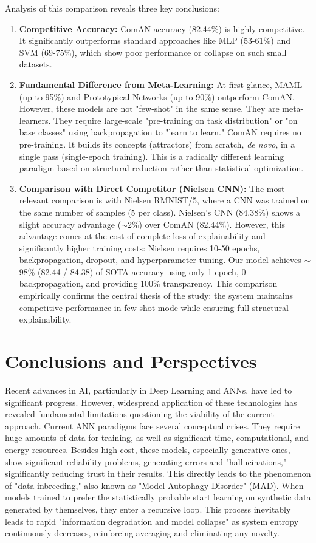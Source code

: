 \documentclass[conference]{IEEEtran}
\begin{document}
Analysis of this comparison reveals three key conclusions:
\begin{enumerate}
    \item \textbf{Competitive Accuracy:} ComAN accuracy (82.44\%) is highly competitive. It significantly outperforms standard approaches like MLP (53-61\%) and SVM (69-75\%), which show poor performance or collapse on such small datasets.
    \item \textbf{Fundamental Difference from Meta-Learning:} At first glance, MAML (up to 95\%) and Prototypical Networks (up to 90\%) outperform ComAN. However, these models are not "few-shot" in the same sense. They are meta-learners. They require large-scale "pre-training on task distribution" or "on base classes" using backpropagation to "learn to learn." ComAN requires no pre-training. It builds its concepts (attractors) from scratch, \textit{de novo}, in a single pass (single-epoch training). This is a radically different learning paradigm based on structural reduction rather than statistical optimization.
    \item \textbf{Comparison with Direct Competitor (Nielsen CNN):} The most relevant comparison is with Nielsen RMNIST/5, where a CNN was trained on the same number of samples (5 per class). Nielsen's CNN (84.38\%) shows a slight accuracy advantage ($\sim$2\%) over ComAN (82.44\%). However, this advantage comes at the cost of complete loss of explainability and significantly higher training costs: Nielsen requires 10-50 epochs, backpropagation, dropout, and hyperparameter tuning. Our model achieves $\sim$98\% (82.44 / 84.38) of SOTA accuracy using only 1 epoch, 0 backpropagation, and providing 100\% transparency. This comparison empirically confirms the central thesis of the study: the system maintains competitive performance in few-shot mode while ensuring full structural explainability.
\end{enumerate}

\section{Conclusions and Perspectives}
Recent advances in AI, particularly in Deep Learning and ANNs, have led to significant progress. However, widespread application of these technologies has revealed fundamental limitations questioning the viability of the current approach. Current ANN paradigms face several conceptual crises. They require huge amounts of data for training, as well as significant time, computational, and energy resources. Besides high cost, these models, especially generative ones, show significant reliability problems, generating errors and "hallucinations," significantly reducing trust in their results. This directly leads to the phenomenon of "data inbreeding," also known as "Model Autophagy Disorder" (MAD). When models trained to prefer the statistically probable start learning on synthetic data generated by themselves, they enter a recursive loop. This process inevitably leads to rapid "information degradation and model collapse" as system entropy continuously decreases, reinforcing averaging and eliminating any novelty.
\end{document}
